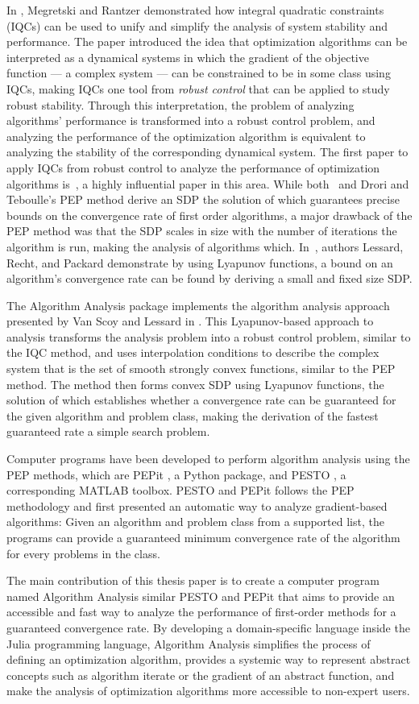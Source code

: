 In \cite{iqc}, Megretski and Rantzer demonstrated how integral quadratic constraints (IQCs) can be used to unify and simplify the analysis of system stability and performance. The paper introduced the idea that optimization algorithms can be interpreted as a dynamical systems in which the gradient of the objective function --- a complex system --- can be constrained to be in some class using IQCs, making IQCs one tool from \textit{robust control} that can be applied to study robust stability. Through this interpretation, the problem of analyzing algorithms' performance is transformed into a robust control problem, and analyzing the performance of the optimization algorithm is equivalent to analyzing the stability of the corresponding dynamical system. The first paper to apply IQCs from robust control to analyze the performance of optimization algorithms is~\cite{lessard2016}, a highly influential paper in this area. While both~\cite{lessard2016} and Drori and Teboulle's PEP method derive an SDP the solution of which guarantees precise bounds on the convergence rate of first order algorithms, a major drawback of the PEP method was that the SDP scales in size with the number of iterations the algorithm is run, making the analysis of algorithms which. In~\cite{lessard2016}, authors Lessard, Recht, and Packard demonstrate by using Lyapunov functions, a bound on an algorithm's convergence rate can be found by deriving a small and fixed size SDP.

The Algorithm Analysis package implements the algorithm analysis approach presented by Van Scoy and Lessard in \cite{tutorial}. This Lyapunov-based approach to analysis transforms the analysis problem into a robust control problem, similar to the IQC method, and uses interpolation conditions to describe the complex system that is the set of smooth strongly convex functions, similar to the PEP method. The method then forms convex SDP using Lyapunov functions, the solution of which establishes whether a convergence rate can be guaranteed for the given algorithm and problem class, making the derivation of the fastest guaranteed rate a simple search problem.

Computer programs have been developed to perform algorithm analysis using the PEP methods, which are PEPit \cite{pepit}, a Python package, and PESTO \cite{pesto}, a corresponding MATLAB toolbox. PESTO and PEPit follows the PEP methodology and first presented an automatic way to analyze gradient-based algorithms: Given an algorithm and problem class from a supported list, the programs can provide a guaranteed minimum convergence rate of the algorithm for every problems in the class.

The main contribution of this thesis paper is to create a computer program named Algorithm Analysis similar PESTO and PEPit that aims to provide an accessible and fast way to analyze the performance of first-order methods for a guaranteed convergence rate. By developing a domain-specific language inside the Julia programming language, Algorithm Analysis simplifies the process of defining an optimization algorithm, provides a systemic way to represent abstract concepts such as algorithm iterate or the gradient of an abstract function, and make the analysis of optimization algorithms more accessible to non-expert users.